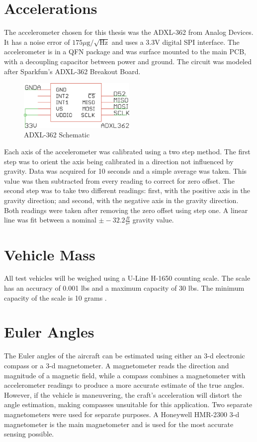 \section{Accelerations}
The accelerometer chosen for this thesis was the ADXL-362 from Analog Devices. It has a noise error of $175\mu\text{g}/\sqrt{\text{Hz}}$ and uses a 3.3V digital SPI interface\cite{adxl362DataSheet}. The accelerometer is in a QFN package and was surface mounted to the main PCB, with a decoupling capacitor between power and ground. The circuit was modeled after Sparkfun's ADXL-362 Breakout Board\cite{Sparkfunadxl362BOB}.
\begin{figure}[h!]
  \caption{ADXL-362 Schematic} \label{adxl362Schematic}
  \centering
    \includegraphics[width=0.5\textwidth]{figures/adxl362.eps}
\end{figure}

Each axis of the accelerometer was calibrated using a two step method. The first step was to orient the axis being calibrated in a direction not influenced by gravity. Data was acquired for 10 seconds and a simple average was taken. This value was then subtracted from every reading to correct for zero offset. The second step was to take two different readings: first, with the positive axis in the gravity direction; and second, with the negative axis in the gravity direction. Both readings were taken after removing the zero offset using step one. A linear line was fit between a nominal $\pm-32.2 \frac{ft}{s^2}$ gravity value.
\section{Vehicle Mass}
All test vehicles will be weighed using a U-Line H-1650 counting scale. The scale has an accuracy of 0.001 lbs and a maximum capacity of 30 lbs. The minimum capacity of the scale is 10 grams \cite{U-Line}.
\section{Euler Angles}
The Euler angles of the aircraft can be estimated using either an 3-d electronic compass or a 3-d magnetometer. A magnetometer reads the direction and magnitude of a magnetic field, while a compass combines a magnetometer with accelerometer readings to produce a more accurate estimate of the true angles. However, if the vehicle is maneuvering, the craft's acceleration will distort the angle estimation, making compasses unsuitable for this application. Two separate magnetometers were used for separate purposes. A Honeywell HMR-2300 3-d magnetometer is the main magnetometer and is used for the most accurate sensing possible. 

